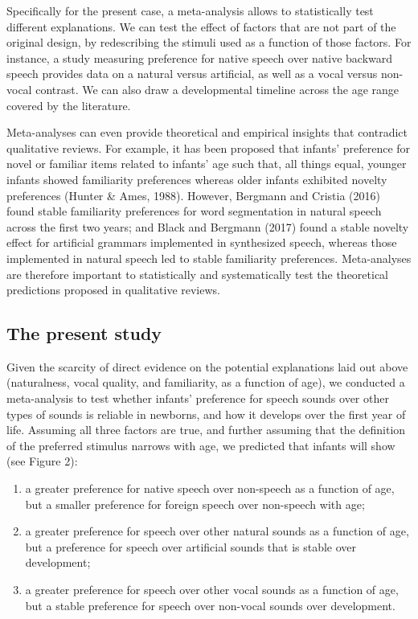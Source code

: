 \documentclass[man]{apa6}
\providecommand{\tightlist}{%
  \setlength{\itemsep}{0pt}\setlength{\parskip}{0pt}}
\begin{document}
Specifically for the present case, a meta-analysis allows to
statistically test different explanations. We can test the effect of
factors that are not part of the original design, by redescribing the
stimuli used as a function of those factors. For instance, a study
measuring preference for native speech over native backward speech
provides data on a natural versus artificial, as well as a vocal versus
non-vocal contrast. We can also draw a developmental timeline across the
age range covered by the literature.

Meta-analyses can even provide theoretical and empirical insights that
contradict qualitative reviews. For example, it has been proposed that
infants' preference for novel or familiar items related to infants' age
such that, all things equal, younger infants showed familiarity
preferences whereas older infants exhibited novelty preferences (Hunter
\& Ames, 1988). However, Bergmann and Cristia (2016) found stable
familiarity preferences for word segmentation in natural speech across
the first two years; and Black and Bergmann (2017) found a stable
novelty effect for artificial grammars implemented in synthesized
speech, whereas those implemented in natural speech led to stable
familiarity preferences. Meta-analyses are therefore important to
statistically and systematically test the theoretical predictions
proposed in qualitative reviews.

\subsection{The present study}\label{the-present-study}

Given the scarcity of direct evidence on the potential explanations laid
out above (naturalness, vocal quality, and familiarity, as a function of
age), we conducted a meta-analysis to test whether infants' preference
for speech sounds over other types of sounds is reliable in newborns,
and how it develops over the first year of life. Assuming all three
factors are true, and further assuming that the definition of the
preferred stimulus narrows with age, we predicted that infants will show
(see Figure 2):

\begin{enumerate}
\def\labelenumi{\arabic{enumi}.}
\tightlist
\item
  a greater preference for native speech over non-speech as a function
  of age, but a smaller preference for foreign speech over non-speech
  with age;
\item
  a greater preference for speech over other natural sounds as a
  function of age, but a preference for speech over artificial sounds
  that is stable over development;
\item
  a greater preference for speech over other vocal sounds as a function
  of age, but a stable preference for speech over non-vocal sounds over
  development.
\end{enumerate}
\end{document}
